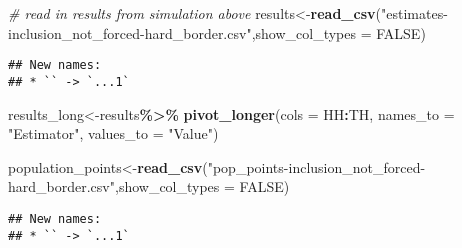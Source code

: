 \documentclass[
]{article}
\newenvironment{Shaded}{\begin{snugshade}}{\end{snugshade}}
\newcommand{\AttributeTok}[1]{\textcolor[rgb]{0.13,0.29,0.53}{#1}}
\newcommand{\CommentTok}[1]{\textcolor[rgb]{0.56,0.35,0.01}{\textit{#1}}}
\newcommand{\ConstantTok}[1]{\textcolor[rgb]{0.56,0.35,0.01}{#1}}
\newcommand{\FunctionTok}[1]{\textcolor[rgb]{0.13,0.29,0.53}{\textbf{#1}}}
\newcommand{\NormalTok}[1]{#1}
\newcommand{\OtherTok}[1]{\textcolor[rgb]{0.56,0.35,0.01}{#1}}
\newcommand{\SpecialCharTok}[1]{\textcolor[rgb]{0.81,0.36,0.00}{\textbf{#1}}}
\newcommand{\StringTok}[1]{\textcolor[rgb]{0.31,0.60,0.02}{#1}}
\begin{document}
\begin{Shaded}
\begin{Highlighting}[]
\CommentTok{\# read in results from simulation above}
\NormalTok{results}\OtherTok{\textless{}{-}}\FunctionTok{read\_csv}\NormalTok{(}\StringTok{"estimates{-}inclusion\_not\_forced{-}hard\_border.csv"}\NormalTok{,}\AttributeTok{show\_col\_types =} \ConstantTok{FALSE}\NormalTok{)}
\end{Highlighting}
\end{Shaded}

\begin{verbatim}
## New names:
## * `` -> `...1`
\end{verbatim}

\begin{Shaded}
\begin{Highlighting}[]
\NormalTok{results\_long}\OtherTok{\textless{}{-}}\NormalTok{results}\SpecialCharTok{\%\textgreater{}\%}
  \FunctionTok{pivot\_longer}\NormalTok{(}\AttributeTok{cols =}\NormalTok{ HH}\SpecialCharTok{:}\NormalTok{TH,}
               \AttributeTok{names\_to =} \StringTok{"Estimator"}\NormalTok{, }
               \AttributeTok{values\_to =} \StringTok{"Value"}\NormalTok{)}

\NormalTok{population\_points}\OtherTok{\textless{}{-}}\FunctionTok{read\_csv}\NormalTok{(}\StringTok{"pop\_points{-}inclusion\_not\_forced{-}hard\_border.csv"}\NormalTok{,}\AttributeTok{show\_col\_types =} \ConstantTok{FALSE}\NormalTok{)}
\end{Highlighting}
\end{Shaded}

\begin{verbatim}
## New names:
## * `` -> `...1`
\end{verbatim}
\end{document}
